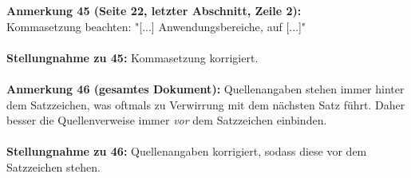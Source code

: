 \documentclass[a4paper,12pt]{book}
\begin{document}
\noindent
\textbf{Anmerkung 45 (Seite 22, letzter Abschnitt, Zeile 2):}\\
Kommasetzung beachten: "[...] Anwendungsbereiche\emph{,} auf [...]" \\
\\
\textbf{Stellungnahme zu 45:}
Kommasetzung korrigiert.
\\ \\
\noindent
\textbf{Anmerkung 46 (gesamtes Dokument):}
Quellenangaben stehen immer hinter dem Satzzeichen, was oftmals zu Verwirrung mit dem nächsten Satz führt. Daher besser die Quellenverweise immer \emph{vor} dem Satzzeichen einbinden. \\
\\
\textbf{Stellungnahme zu 46:}
Quellenangaben korrigiert, sodass diese vor dem Satzzeichen stehen.
\\
\end{document}
